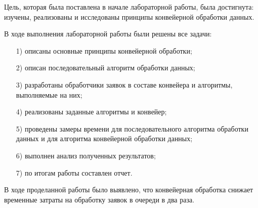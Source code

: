 Цель, которая была поставлена в начале лабораторной работы, была достигнута: изучены, реализованы и исследованы принципы конвейерной обработки данных.

В ходе выполнения лабораторной работы были решены все задачи:
\begin{enumerate}
	\item[1)] описаны основные принципы конвейерной обработки;
\item[2)] описан последовательный алгоритм обработки данных;
\item[3)]
разработаны обработчики заявок в составе конвейера и алгоритмы, выполняемые на них;
\item[4)] реализованы заданные алгоритмы и конвейер;
\item[5)] проведены замеры времени для последовательного алгоритма обработки данных и для алгоритма конвейерной обработки данных;%
\item[6)] выполнен анализ полученных результатов;
\item[7)] по итогам работы составлен отчет.
\end{enumerate}


В ходе проделанной работы было выявлено, что конвейерная обработка снижает временные затраты на обработку заявок в очереди в два раза.
